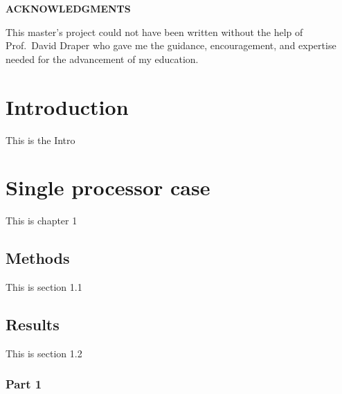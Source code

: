 \documentclass[12pt]{report}
\begin{document}

\setcounter{page}{2}

\newpage

\mbox{}

\newpage

\singlespacing

\tableofcontents

\setcounter{tocdepth}{2}

\listoftables

\listoffigures

\newpage

\begin{center}

\textbf{\large ACKNOWLEDGMENTS}

\end{center}

\bigskip

\noindent
This master's project could not have been written without the help of
Prof.~David Draper who gave me the guidance,
encouragement, and expertise needed for the advancement of my education. 

\newpage


\chapter{Introduction}

This is the Intro

\newpage

\chapter{Single processor case}

This is chapter 1

\section{Methods}
This is section 1.1


\section{Results}

This is section 1.2

\subsection{Part 1}
\end{document}
